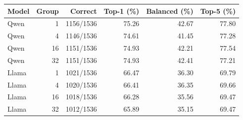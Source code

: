 \begin{tabular}{lrrrrr}
\hline
Model & Group & Correct & Top-1 (\%) & Balanced (\%) & Top-5 (\%) \\
\hline
Qwen & 1 & 1156/1536 & 75.26 & 42.67 & 77.80 \\
Qwen & 4 & 1146/1536 & 74.61 & 41.45 & 77.28 \\
Qwen & 16 & 1151/1536 & 74.93 & 42.21 & 77.54 \\
Qwen & 32 & 1151/1536 & 74.93 & 42.41 & 77.21 \\
Llama & 1 & 1021/1536 & 66.47 & 36.30 & 69.79 \\
Llama & 4 & 1020/1536 & 66.41 & 36.35 & 69.66 \\
Llama & 16 & 1018/1536 & 66.28 & 35.56 & 69.47 \\
Llama & 32 & 1012/1536 & 65.89 & 35.15 & 69.47 \\
\hline
\end{tabular}
